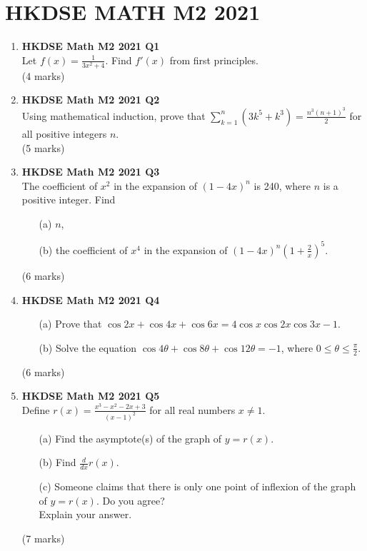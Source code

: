 \documentclass{report}
\begin{document}
\chapter{HKDSE MATH M2 2021}
\begin{enumerate}
	\item \textbf{HKDSE Math M2 2021 Q1}\\
	Let $\displaystyle f(x) = \frac{1}{3x^{2}+4}$. Find $f'(x)$ from first principles. \\(4 marks)

	\item \textbf{HKDSE Math M2 2021 Q2}\\
	Using mathematical induction, prove that $\displaystyle \sum_{k = 1}^{n} (3k^{5} + k^{3}) = \frac{n^{3} (n+1)^{3}}{2}$ for all positive integers $n$. \\
	(5 marks)


	\item \textbf{HKDSE Math M2 2021 Q3}\\
	The coefficient of $x^2$ in the expansion of $(1-4x)^n$ is 240, where $n$ is a positive integer. Find
	\begin{enumerate}
		\item[(a)]
		$n$,
		\item[(b)]
		the coefficient of $x^4$ in the expansion of $\displaystyle(1-4x)^n\left(1+\frac{2}{x}\right)^5$. 
	\end{enumerate}
	(6 marks)

	\item \textbf{HKDSE Math M2 2021 Q4}
	\begin{enumerate}
		\item [(a)] Prove that $\cos{2x} + \cos {4x} + \cos {6x} = 4\cos{x}\cos{2x}\cos{3x} -1$.
		\item [(b)] Solve the equation $\cos{4\theta} + \cos{8\theta} + \cos{12\theta} = -1$, where $\displaystyle0 \leq \theta \leq \frac{\pi}{2}$.
	\end{enumerate}
	(6 marks)

	\item \textbf{HKDSE Math M2 2021 Q5}\\
	Define $\displaystyle r(x) = \frac{x^3 - x^2 -2x + 3}{(x-1)^2}$ for all real numbers $x \neq 1$.
	\begin{enumerate}
		\item [(a)] Find the asymptote(s) of the graph of $y = r(x)$.
		\item [(b)] Find $\displaystyle\frac{d}{dx}r(x)$.
		\item [(c)] Someone claims that there is only one point of inflexion of the graph of $y = r(x)$. Do you agree? \\
		Explain your answer.
	\end{enumerate}
	(7 marks)


\end{enumerate}
\end{document}

